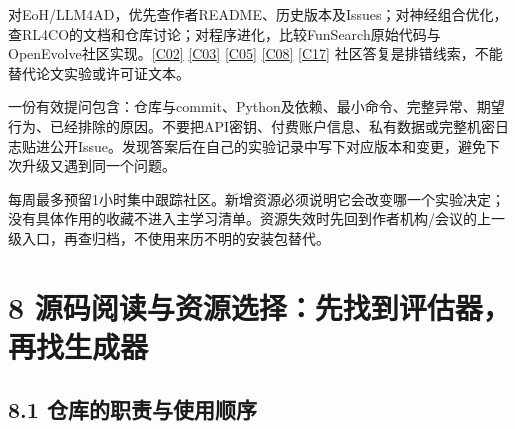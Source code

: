 对EoH/LLM4AD，优先查作者README、历史版本及Issues；对神经组合优化，查RL4CO的文档和仓库讨论；对程序进化，比较FunSearch原始代码与OpenEvolve社区实现。\href{https://github.com/FeiLiu36/EoH}{{[}C02{]}}
\href{https://github.com/Optima-CityU/LLM4AD}{{[}C03{]}}
\href{https://github.com/google-deepmind/funsearch}{{[}C05{]}}
\href{https://github.com/algorithmicsuperintelligence/openevolve}{{[}C08{]}}
\href{https://github.com/ai4co/rl4co}{{[}C17{]}}
社区答复是排错线索，不能替代论文实验或许可证文本。

一份有效提问包含：仓库与commit、Python及依赖、最小命令、完整异常、期望行为、已经排除的原因。不要把API密钥、付费账户信息、私有数据或完整机密日志贴进公开Issue。发现答案后在自己的实验记录中写下对应版本和变更，避免下次升级又遇到同一个问题。

每周最多预留1小时集中跟踪社区。新增资源必须说明它会改变哪一个实验决定；没有具体作用的收藏不进入主学习清单。资源失效时先回到作者机构/会议的上一级入口，再查归档，不使用来历不明的安装包替代。

\section{8
源码阅读与资源选择：先找到评估器，再找生成器}\label{ux6e90ux7801ux9605ux8bfbux4e0eux8d44ux6e90ux9009ux62e9ux5148ux627eux5230ux8bc4ux4f30ux5668ux518dux627eux751fux6210ux5668}

\subsection{8.1
仓库的职责与使用顺序}\label{ux4ed3ux5e93ux7684ux804cux8d23ux4e0eux4f7fux7528ux987aux5e8f}

